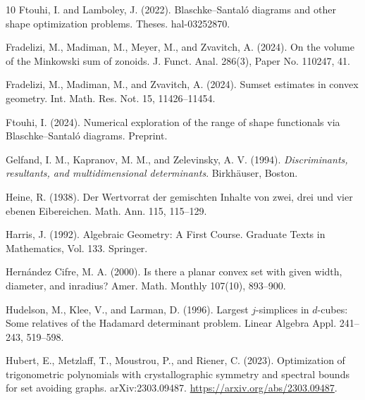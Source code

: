 \documentclass[11pt]{amsart}
\theoremstyle{definition}
\theoremstyle{remark}
\begin{document}
\begin{thebibliography}{10}
 Ftouhi, I. and Lamboley, J. (2022). Blaschke–Santaló diagrams and other shape optimization problems. Theses. hal-03252870.

 Fradelizi, M., Madiman, M., Meyer, M., and Zvavitch, A. (2024). On the volume of the Minkowski sum of zonoids. J. Funct. Anal. 286(3), Paper No. 110247, 41.

 Fradelizi, M., Madiman, M., and Zvavitch, A. (2024). Sumset estimates in convex geometry. Int. Math. Res. Not. 15, 11426–11454.

 Ftouhi, I. (2024). Numerical exploration of the range of shape functionals via Blaschke–Santaló diagrams. Preprint.


 Gelfand, I. M., Kapranov, M. M., and Zelevinsky, A. V. (1994). \emph{Discriminants, resultants, and multidimensional determinants}. Birkhäuser, Boston.

 Heine, R. (1938). Der Wertvorrat der gemischten Inhalte von zwei, drei und vier ebenen Eibereichen. Math. Ann. 115, 115–129.

 Harris, J. (1992). Algebraic Geometry: A First Course. Graduate Texts in Mathematics, Vol. 133. Springer.

 Hernández Cifre, M. A. (2000). Is there a planar convex set with given width, diameter, and inradius? Amer. Math. Monthly 107(10), 893–900.


 Hudelson, M., Klee, V., and Larman, D. (1996). Largest \(j\)-simplices in \(d\)-cubes: Some relatives of the Hadamard determinant problem. Linear Algebra Appl. 241–243, 519–598.

 Hubert, E., Metzlaff, T., Moustrou, P., and Riener, C. (2023). Optimization of trigonometric polynomials with crystallographic symmetry and spectral bounds for set avoiding graphs. arXiv:2303.09487. \url{https://arxiv.org/abs/2303.09487}.



\end{thebibliography}
\end{document}
